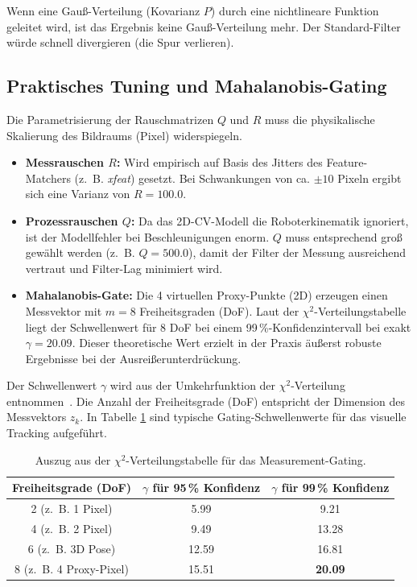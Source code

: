 \documentclass{article}
\begin{document}
Wenn eine Gauß-Verteilung (Kovarianz $P$) durch eine nichtlineare Funktion geleitet wird, ist das Ergebnis keine Gauß-Verteilung mehr. Der Standard-Filter würde schnell divergieren (die Spur verlieren).




\subsection{Praktisches Tuning und Mahalanobis-Gating}
Die Parametrisierung der Rauschmatrizen $Q$ und $R$ muss die physikalische Skalierung des Bildraums (Pixel) widerspiegeln.
\begin{itemize}
    \item \textbf{Messrauschen $R$:} Wird empirisch auf Basis des Jitters des Feature-Matchers (z.~B. \textit{xfeat}) gesetzt. Bei Schwankungen von ca. $\pm 10$ Pixeln ergibt sich eine Varianz von $R = 100.0$.
    \item \textbf{Prozessrauschen $Q$:} Da das 2D-CV-Modell die Roboterkinematik ignoriert, ist der Modellfehler bei Beschleunigungen enorm. $Q$ muss entsprechend groß gewählt werden (z.~B. $Q = 500.0$), damit der Filter der Messung ausreichend vertraut und Filter-Lag minimiert wird.
    \item \textbf{Mahalanobis-Gate:} Die 4 virtuellen Proxy-Punkte (2D) erzeugen einen Messvektor mit $m = 8$ Freiheitsgraden (DoF). Laut der $\chi^2$-Verteilungstabelle liegt der Schwellenwert für 8 DoF bei einem 99\,\%-Konfidenzintervall bei exakt $\gamma = 20.09$. Dieser theoretische Wert erzielt in der Praxis äußerst robuste Ergebnisse bei der Ausreißerunterdrückung.
\end{itemize}

Der Schwellenwert $\gamma$ wird aus der Umkehrfunktion der $\chi^2$-Verteilung entnommen~\cite{bar2001estimation}. Die Anzahl der Freiheitsgrade (DoF) entspricht der Dimension des Messvektors $z_k$. In Tabelle \ref{tab:chi_square} sind typische Gating-Schwellenwerte für das visuelle Tracking aufgeführt.

\begin{table}[h]
    \centering
    \begin{tabular}{c | c | c}
        \textbf{Freiheitsgrade (DoF)} & $\gamma$ \textbf{für 95\,\% Konfidenz} & $\gamma$ \textbf{für 99\,\% Konfidenz} \\
        \hline
        2 (z.~B. 1 Pixel) & 5.99 & 9.21 \\
        4 (z.~B. 2 Pixel) & 9.49 & 13.28 \\
        6 (z.~B. 3D Pose) & 12.59 & 16.81 \\
        8 (z.~B. 4 Proxy-Pixel) & 15.51 & \textbf{20.09} \\
    \end{tabular}
    \caption{Auszug aus der $\chi^2$-Verteilungstabelle für das Measurement-Gating.}
    \label{tab:chi_square}
\end{table}
\end{document}
